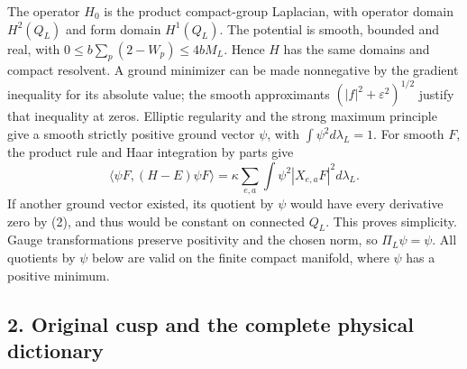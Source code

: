 \documentclass[
  11pt,
]{article}
\begin{document}
The operator \(H_0\) is the product compact-group Laplacian, with
operator domain \(H^2(Q_L)\) and form domain \(H^1(Q_L)\). The potential
is smooth, bounded and real, with \(0\le b\sum_p(2-W_p)\le4bM_L\). Hence
\(H\) has the same domains and compact resolvent. A ground minimizer can
be made nonnegative by the gradient inequality for its absolute value;
the smooth approximants \((|f|^2+\varepsilon^2)^{1/2}\) justify that
inequality at zeros. Elliptic regularity and the strong maximum
principle give a smooth strictly positive ground vector \(\psi\), with
\(\int\psi^2d\lambda_L=1\). For smooth \(F\), the product rule and Haar
integration by parts give \[
 \langle\psi F,(H-E)\psi F\rangle
 =\kappa\sum_{e,a}\int\psi^2|X_{e,a}F|^2d\lambda_L.
\tag{2}
\] If another ground vector existed, its quotient by \(\psi\) would have
every derivative zero by (2), and thus would be constant on connected
\(Q_L\). This proves simplicity. Gauge transformations preserve
positivity and the chosen norm, so \(\Pi_L\psi=\psi\). All quotients by
\(\psi\) below are valid on the finite compact manifold, where \(\psi\)
has a positive minimum.

\subsection{2. Original cusp and the complete physical
dictionary}\label{original-cusp-and-the-complete-physical-dictionary}
\end{document}
